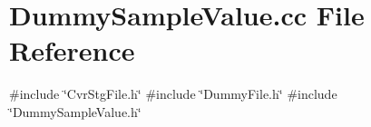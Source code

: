 \section{Dummy\+Sample\+Value.\+cc File Reference}
\label{DummySampleValue_8cc}
{\ttfamily \#include \char`\"{}Cvr\+Stg\+File.\+h\char`\"{}}\newline
{\ttfamily \#include \char`\"{}Dummy\+File.\+h\char`\"{}}\newline
{\ttfamily \#include \char`\"{}Dummy\+Sample\+Value.\+h\char`\"{}}\newline
